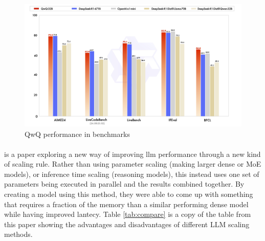 \begin{figure}
    \centering
    \includegraphics[width=1\linewidth]{figure/qwq-32b-final.jpg}
    \caption{QwQ performance in benchmarks}
    \label{fig:qwq-performance}
\end{figure}

\paragraph{}\autocite{chen_parallel_2025} is a paper exploring a new way of improving \acrshort{llm} performance through a new kind of scaling rule. Rather than using parameter scaling (making larger dense or MoE models), or inference time scaling (reasoning models), this instead uses one set of parameters being executed in parallel and the results combined together. By creating a model using this method, they were able to come up with something that requires a fraction of the memory than a similar performing dense model while having improved lantecy. Table \ref{tab:compare} is a copy of the table from this paper showing the advantages and disadvantages of different LLM scaling methods.

{
\begin{table}[t]
\caption{Copy of comparison table from \textcite{chen_parallel_2025}}
\centering
{}
\label{tab:compare}
\end{table}
}

